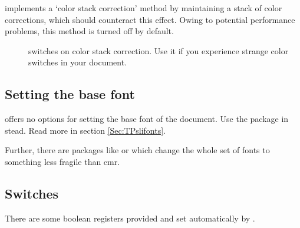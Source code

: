 \documentclass[12pt]{scrartcl}
\let\newslide=\relax
\begin{document}
\newslide

 implements a `color stack correction' method by maintaining a stack of color corrections, which should
counteract this effect. Owing to potential performance problems, this method is turned off by default.
\begin{description}
\item[] switches on color stack correction. Use it if you experience strange color
  switches in your document.
\end{description}

\newslide

\subsection{Setting the base font}\label{Sec:BaseFont}
 offers no options for setting the base font of the document.
Use the  package in stead. Read more in section \ref{Sec:TPslifonts}.

Further, there are packages like  or  which change the whole set of fonts to something less
fragile than cmr.

\newslide

\subsection{Switches}
There are some boolean registers provided and set automatically by .
\end{document}
